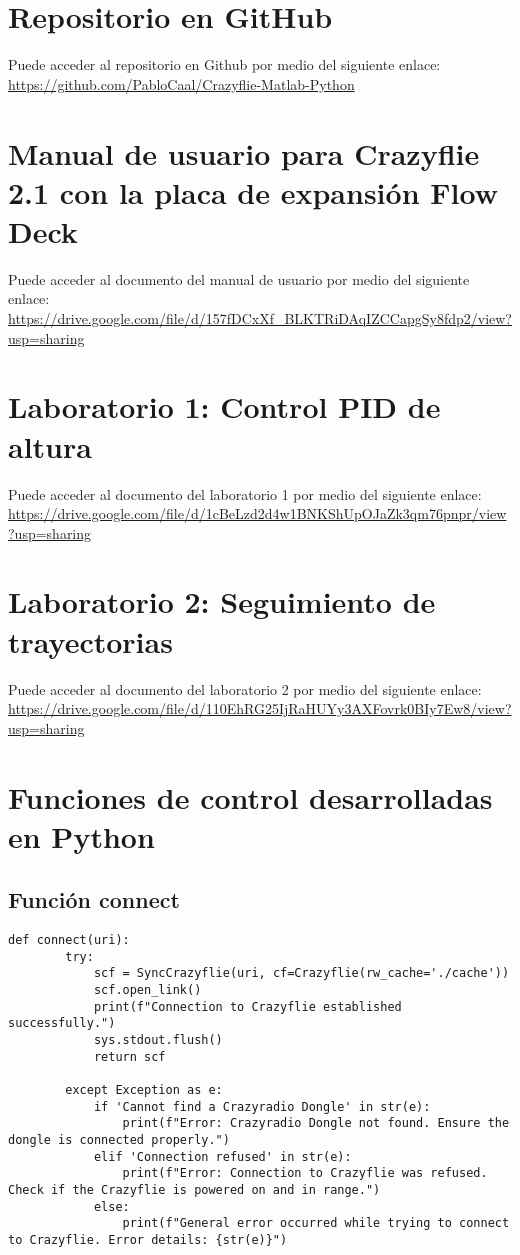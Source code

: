 \section{Repositorio en GitHub}
Puede acceder al repositorio en Github por medio del siguiente enlace: \url{https://github.com/PabloCaal/Crazyflie-Matlab-Python}

\section{Manual de usuario para Crazyflie 2.1 con la placa de expansión Flow Deck}
Puede acceder al documento del manual de usuario por medio del siguiente enlace: \url{https://drive.google.com/file/d/157fDCxXf_BLKTRiDAqIZCCapgSy8fdp2/view?usp=sharing}

\section{Laboratorio 1: Control PID de altura}
Puede acceder al documento del laboratorio 1 por medio del siguiente enlace: \url{https://drive.google.com/file/d/1cBeLzd2d4w1BNKShUpOJaZk3qm76pnpr/view?usp=sharing}

\section{Laboratorio 2: Seguimiento de trayectorias}
Puede acceder al documento del laboratorio 2 por medio del siguiente enlace: \url{https://drive.google.com/file/d/110EhRG25IjRaHUYy3AXFovrk0BIy7Ew8/view?usp=sharing}

\newpage
\section{Funciones de control desarrolladas en Python}
\subsection{Función connect}
\begin{lstlisting}[caption=Función en Python para establecer la conexión con Crazyflie., label=code:funcion_connect]
	def connect(uri):
		try:        
			scf = SyncCrazyflie(uri, cf=Crazyflie(rw_cache='./cache'))
			scf.open_link()
			print(f"Connection to Crazyflie established successfully.")
			sys.stdout.flush()
			return scf
			
		except Exception as e:
			if 'Cannot find a Crazyradio Dongle' in str(e):
				print(f"Error: Crazyradio Dongle not found. Ensure the dongle is connected properly.")
			elif 'Connection refused' in str(e):
				print(f"Error: Connection to Crazyflie was refused. Check if the Crazyflie is powered on and in range.")
			else:
				print(f"General error occurred while trying to connect to Crazyflie. Error details: {str(e)}")
\end{lstlisting}

